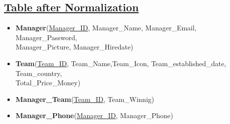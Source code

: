 \subsection*{\underline{Table after Normalization}}
\begin{itemize}
    \item \textbf{Manager}(\underline{Manager\_ID}, Manager\_Name, Manager\_Email, Manager\_Password,\\Manager\_Picture, Manager\_Hiredate)
    \item \textbf{Team}(\underline{Team\_ID}, Team\_Name,Team\_Icon, Team\_established\_date, Team\_country,\\Total\_Price\_Money)
    \item \textbf{Manager\_Team}(\underline{Team\_ID}, Team\_Winnig)
    \item \textbf{Manager\_Phone}(\underline{Manager\_ID}, Manager\_Phone)
\end{itemize}